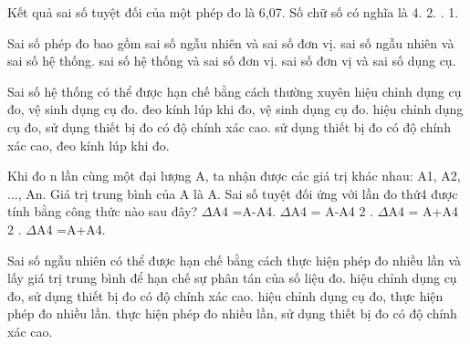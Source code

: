 \begin{ex}
Kết quả sai số tuyệt đối của một phép đo là 6,07. Số chữ số có nghĩa là
\choice
{4.}
{2.}
{.}
{1.}
\end{ex}

\begin{ex}
Sai số phép đo bao gồm
\choice
{sai số ngẫu nhiên và sai số đơn vị.}
{\True sai số ngẫu nhiên và sai số hệ thống.}
{sai số hệ thống và sai số đơn vị.}
{sai số đơn vị và sai số dụng cụ.}
\end{ex}

\begin{ex}
Sai số hệ thống có thể được hạn chế bằng cách thường xuyên
\choice
{hiệu chỉnh dụng cụ đo, vệ sinh dụng cụ đo.}
{đeo kính lúp khi đo, vệ sinh dụng cụ đo.}
{\True hiệu chỉnh dụng cụ đo, sử dụng thiết bị đo có độ chính xác cao.}
{sử dụng thiết bị đo có độ chính xác cao, đeo kính lúp khi đo.}
\end{ex}

\begin{ex}
Khi đo n lần cùng một đại lượng A, ta nhận được các giá trị khác nhau: A1, A2,
..., An. Giá trị trung bình của A là A. Sai số tuyệt đối ứng với lần đo thứ4 được tính bằng
công thức nào sau đây?
\choice
{\True $\Delta$A4 =A-A4.}
{$\Delta$A4 = A-A4 2 .}
{$\Delta$A4 = A+A4 2 .}
{$\Delta$A4 =A+A4.}
\end{ex}

\begin{ex}
Sai số ngẫu nhiên có thể được hạn chế bằng cách
\choice
{\True thực hiện phép đo nhiều lần và lấy giá trị trung bình để hạn chế sự phân tán của số liệu đo.}
{hiệu chỉnh dụng cụ đo, sử dụng thiết bị đo có độ chính xác cao.}
{hiệu chỉnh dụng cụ đo, thực hiện phép đo nhiều lần.}
{thực hiện phép đo nhiều lần, sử dụng thiết bị đo có độ chính xác cao.}
\end{ex}

